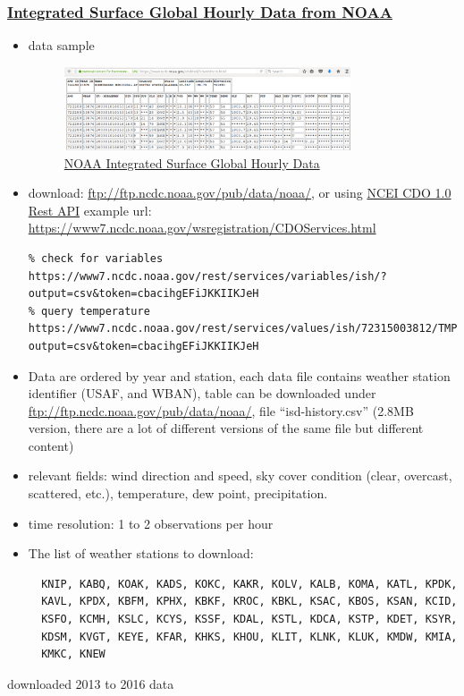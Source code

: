 \documentclass[12pt]{article}
\begin{document}
\subsubsection{\href{https://gis.ncdc.noaa.gov/geoportal/catalog/search/resource/details.page?id=gov.noaa.ncdc:C00532}{Integrated Surface Global Hourly Data from NOAA}}
\begin{itemize}
\item data sample
  \begin{figure}[h!]
    \centering
    \includegraphics[width=0.8\textwidth]{images/noaa_ish.png}
    \caption{\href{https://gis.ncdc.noaa.gov/geoportal/catalog/search/resource/details.page?id=gov.noaa.ncdc:C00532}{NOAA Integrated Surface Global Hourly Data}}
    \label{fig:noaa_ish}
  \end{figure}
  \FloatBarrier
\item download: \url{ftp://ftp.ncdc.noaa.gov/pub/data/noaa/}, or using
  \href{https://www7.ncdc.noaa.gov/rest/}{NCEI CDO 1.0 Rest API}
example url: \url{https://www7.ncdc.noaa.gov/wsregistration/CDOServices.html}
\begin{verbatim}
% check for variables
https://www7.ncdc.noaa.gov/rest/services/variables/ish/?output=csv&token=cbacihgEFiJKKIIKJeH
% query temperature
https://www7.ncdc.noaa.gov/rest/services/values/ish/72315003812/TMP/200101010000/200101022359/?output=csv&token=cbacihgEFiJKKIIKJeH
\end{verbatim}
\item Data are ordered by year and station, each data file contains
  weather station identifier (USAF, and WBAN), table can be downloaded
  under \url{ftp://ftp.ncdc.noaa.gov/pub/data/noaa/}, file
  ``isd-history.csv'' (2.8MB version, there are a lot of different
  versions of the same file but different content)
\item relevant fields: wind direction and speed, sky cover condition
  (clear, overcast, scattered, etc.), temperature, dew point,
  precipitation.
\item time resolution: 1 to 2 observations per hour
\item The list of weather stations to download:
\begin{verbatim}
  KNIP, KABQ, KOAK, KADS, KOKC, KAKR, KOLV, KALB, KOMA, KATL, KPDK,
  KAVL, KPDX, KBFM, KPHX, KBKF, KROC, KBKL, KSAC, KBOS, KSAN, KCID,
  KSFO, KCMH, KSLC, KCYS, KSSF, KDAL, KSTL, KDCA, KSTP, KDET, KSYR,
  KDSM, KVGT, KEYE, KFAR, KHKS, KHOU, KLIT, KLNK, KLUK, KMDW, KMIA,
  KMKC, KNEW
\end{verbatim}
\end{itemize}
downloaded 2013 to 2016 data
\end{document}
